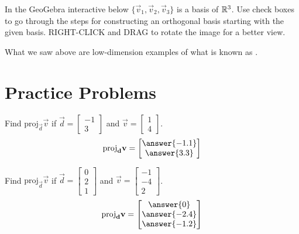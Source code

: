 \documentclass{ximera}
\begin{document}
\begin{exploration}\label{exp:orth3}
In the GeoGebra interactive below $\{\vec{v}_1, \vec{v}_2, \vec{v}_3\}$ is a basis of $\mathbb{R}^3$.  Use check boxes to go through the steps for constructing an orthogonal basis starting with the given basis.  RIGHT-CLICK and DRAG to rotate the image for a better view.


\begin{onlineOnly}
\begin{center}
\end{center}
\end{onlineOnly}
\end{exploration}

What we saw above are low-dimension examples of what is known as .  


\section*{Practice Problems}

  \begin{problem}\label{prob:proj1a}
  Find $\mbox{proj}_{\vec{d}}\vec{v}$ if $\vec{d}=\begin{bmatrix}-1\\3\end{bmatrix}$ and $\vec{v}=\begin{bmatrix}1\\4\end{bmatrix}$.
  $$\mbox{proj}_{\vec{d}}\vec{v}=\begin{bmatrix}\answer{-1.1}\\\answer{3.3}\end{bmatrix}$$
    \end{problem}
    
    \begin{problem}\label{prob:proj1b}
    Find $\mbox{proj}_{\vec{d}}\vec{v}$ if $\vec{d}=\begin{bmatrix}0\\2\\1\end{bmatrix}$ and $\vec{v}=\begin{bmatrix}-1\\-4\\2\end{bmatrix}$.
    $$\mbox{proj}_{\vec{d}}\vec{v}=\begin{bmatrix}\answer{0}\\\answer{-2.4}\\\answer{-1.2}\end{bmatrix}$$
    \end{problem}
\end{document}

